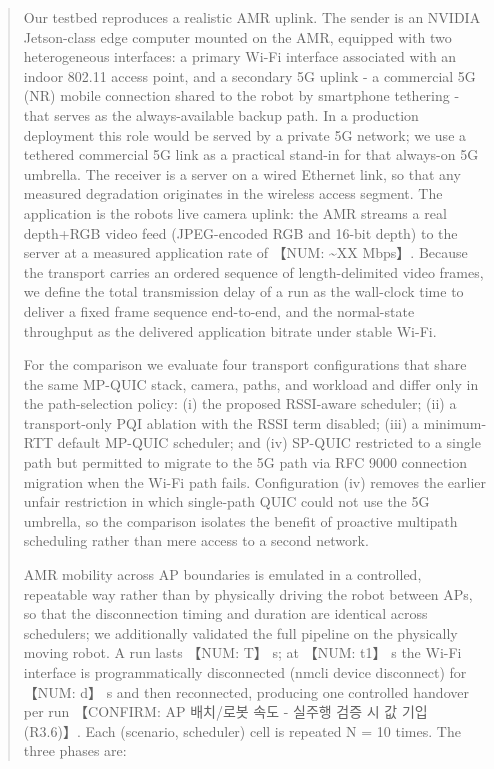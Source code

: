 \begin{quote}
Our testbed reproduces a realistic AMR uplink. The sender is an NVIDIA Jetson-class edge computer mounted on the AMR, equipped with two heterogeneous interfaces: a primary Wi-Fi interface associated with an indoor 802.11 access point, and a secondary 5G uplink - a commercial 5G (NR) mobile connection shared to the robot by smartphone tethering - that serves as the always-available backup path. In a production deployment this role would be served by a private 5G network; we use a tethered commercial 5G link as a practical stand-in for that always-on 5G umbrella. The receiver is a server on a wired Ethernet link, so that any measured degradation originates in the wireless access segment. The application is the robot\textquotesingle s live camera uplink: the AMR streams a real depth+RGB video feed (JPEG-encoded RGB and 16-bit depth) to the server at a measured application rate of 【NUM: \textasciitilde XX Mbps】. Because the transport carries an ordered sequence of length-delimited video frames, we define the total transmission delay of a run as the wall-clock time to deliver a fixed frame sequence end-to-end, and the normal-state throughput as the delivered application bitrate under stable Wi-Fi.

For the comparison we evaluate four transport configurations that share the same MP-QUIC stack, camera, paths, and workload and differ only in the path-selection policy: (i) the proposed RSSI-aware scheduler; (ii) a transport-only PQI ablation with the RSSI term disabled; (iii) a minimum-RTT default MP-QUIC scheduler; and (iv) SP-QUIC restricted to a single path but permitted to migrate to the 5G path via RFC 9000 connection migration when the Wi-Fi path fails. Configuration (iv) removes the earlier unfair restriction in which single-path QUIC could not use the 5G umbrella, so the comparison isolates the benefit of proactive multipath scheduling rather than mere access to a second network.

AMR mobility across AP boundaries is emulated in a controlled, repeatable way rather than by physically driving the robot between APs, so that the disconnection timing and duration are identical across schedulers; we additionally validated the full pipeline on the physically moving robot. A run lasts 【NUM: T】 s; at 【NUM: t1】 s the Wi-Fi interface is programmatically disconnected (nmcli device disconnect) for 【NUM: d】 s and then reconnected, producing one controlled handover per run 【CONFIRM: AP 배치/로봇 속도 - 실주행 검증 시 값 기입 (R3.6)】. Each (scenario, scheduler) cell is repeated N = 10 times. The three phases are:
\end{quote}

